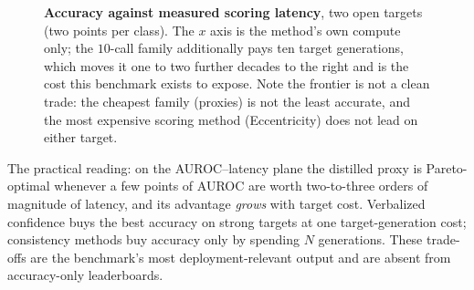 \documentclass[11pt]{article}
\begin{document}
\begin{figure}[t]
\centering
{}
\caption{\textbf{Accuracy against measured scoring latency}, two open targets (two points per
class). The $x$ axis is the method's own compute only; the $10$-call family additionally pays ten
target generations, which moves it one to two further decades to the right and is the cost this
benchmark exists to expose. Note the frontier is not a clean trade: the cheapest family (proxies)
is not the least accurate, and the most expensive scoring method (Eccentricity) does not lead on
either target.}
\label{fig:pareto2}
\end{figure}

The practical reading: on the AUROC--latency plane the distilled proxy is Pareto-optimal
whenever a few points of AUROC are worth two-to-three orders of magnitude of latency, and
its advantage \emph{grows} with target cost. Verbalized confidence buys the best
accuracy on strong targets at one target-generation cost; consistency methods buy
accuracy only by spending $N$ generations. These trade-offs are the benchmark's most
deployment-relevant output and are absent from accuracy-only leaderboards.

\end{document}
